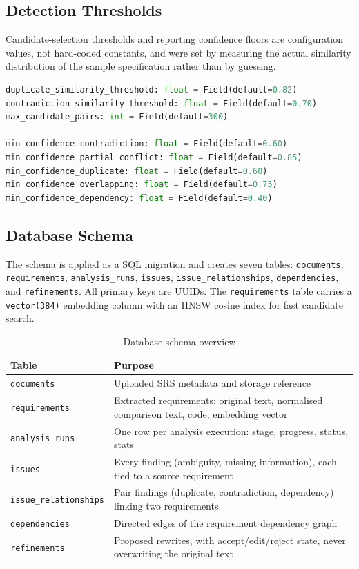 \documentclass[11pt,a4paper]{article}
\begin{document}
\subsection{Detection Thresholds}

Candidate-selection thresholds and reporting confidence floors are
configuration values, not hard-coded constants, and were set by measuring
the actual similarity distribution of the sample specification rather than
by guessing.

\begin{lstlisting}[language=Python, caption={app/core/config.py -- measured thresholds}]
duplicate_similarity_threshold: float = Field(default=0.82)
contradiction_similarity_threshold: float = Field(default=0.70)
max_candidate_pairs: int = Field(default=300)

min_confidence_contradiction: float = Field(default=0.60)
min_confidence_partial_conflict: float = Field(default=0.85)
min_confidence_duplicate: float = Field(default=0.60)
min_confidence_overlapping: float = Field(default=0.75)
min_confidence_dependency: float = Field(default=0.40)
\end{lstlisting}

\subsection{Database Schema}

The schema is applied as a SQL migration and creates seven tables:
\texttt{documents}, \texttt{requirements}, \texttt{analysis\_runs},
\texttt{issues}, \texttt{issue\_relationships}, \texttt{dependencies}, and
\texttt{refinements}. All primary keys are UUIDs. The \texttt{requirements}
table carries a \texttt{vector(384)} embedding column with an HNSW cosine
index for fast candidate search.

\begin{table}[h!]
\centering
\begin{tabular}{p{3.4cm} p{9.8cm}}
\toprule
\textbf{Table} & \textbf{Purpose} \\
\midrule
\texttt{documents} & Uploaded SRS metadata and storage reference \\
\texttt{requirements} & Extracted requirements: original text, normalised
  comparison text, code, embedding vector \\
\texttt{analysis\_runs} & One row per analysis execution: stage, progress,
  status, stats \\
\texttt{issues} & Every finding (ambiguity, missing information), each
  tied to a source requirement \\
\texttt{issue\_relationships} & Pair findings (duplicate, contradiction,
  dependency) linking two requirements \\
\texttt{dependencies} & Directed edges of the requirement dependency graph \\
\texttt{refinements} & Proposed rewrites, with accept/edit/reject state,
  never overwriting the original text \\
\bottomrule
\end{tabular}
\caption{Database schema overview}
\end{table}
\end{document}
